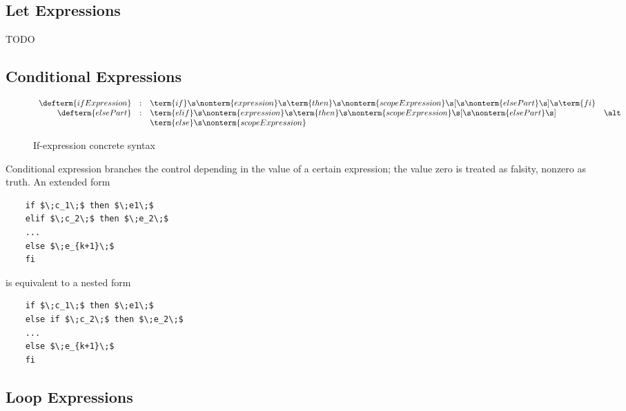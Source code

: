 \FloatBarrier

\subsection{Let Expressions}

TODO

\FloatBarrier

\subsection{Conditional Expressions}

\begin{figure}[h]
  \[
    \begin{array}{rcll}
      \defterm{ifExpression}  & : & \term{if}\s\nonterm{expression}\s\term{then}\s\nonterm{scopeExpression}\s[\s\nonterm{elsePart}\s]\s\term{fi}&\\
      \defterm{elsePart}      & : & \term{elif}\s\nonterm{expression}\s\term{then}\s\nonterm{scopeExpression}\s[\s\nonterm{elsePart}\s]&\alt\\
                              &   & \term{else}\s\nonterm{scopeExpression}&
    \end{array}
  \]
  \caption{If-expression concrete syntax}
  \label{if_expression}
\end{figure}

Conditional expression branches the control depending in the value of a certain expression; the value zero is treated as falsity, nonzero as truth. An
extended form

\begin{lstlisting}
    if $\;c_1\;$ then $\;e1\;$
    elif $\;c_2\;$ then $\;e_2\;$
    ...
    else $\;e_{k+1}\;$
    fi
\end{lstlisting}

is equivalent to a nested form

\begin{lstlisting}
    if $\;c_1\;$ then $\;e1\;$
    else if $\;c_2\;$ then $\;e_2\;$
    ...
    else $\;e_{k+1}\;$
    fi
\end{lstlisting}

\FloatBarrier

\subsection{Loop Expressions}

